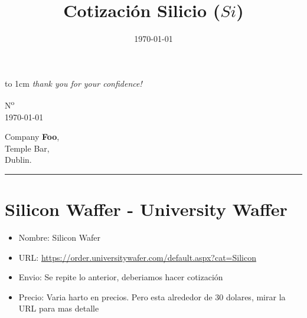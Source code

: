 \documentclass[a4paper]{article}
\title{Cotización Silicio ($Si$)}
\date{\today}
\makeatletter
\let\displayFont\relax
\let\thetitle\@title
\makeatother
\begin{document}
\parbox[b][2cm][t]{\rightalignment}{{\color{gray!95}\displayFont\fontsize{1.5cm}{1.5cm}\selectfont %
\vbox to 1cm{\vss %
%
\companyname{}%
%
}}
\vskip 3mm%
{\fontsize{0.44cm}{0.5cm}%
\emph{thank you for your confidence!}%
}
}%
%
\parbox[b][2cm][t]{0.35\textwidth}{}

\kern -5mm

\leavevmode\kern \rightalignment \parbox{0.35\textwidth}{\ttfamily N\textsuperscript{o} \invoicenum\\
\today }

\vskip 0.7cm

\leavevmode\kern \rightalignment\kern -3mm \colorbox{gray!85}{
  \kern 1mm\begin{minipage}[t]{0.5\textwidth}
    \color{white}
    \vskip 2mm
    Company \textbf{Foo},\\
    Temple Bar,\\
    Dublin.\\
    \vspace*{-3mm}%
  \end{minipage}
}

\vskip 2.3cm

\begin{center}
{\ttfamily\LARGE \thetitle}

\rule{2cm}{0.25pt}
\end{center}

\section{Silicon Waffer - University Waffer}
\begin{itemize}
  \item Nombre: Silicon Wafer 
  \item URL: \url{https://order.universitywafer.com/default.aspx?cat=Silicon}
  \item Envio: Se repite lo anterior, deberiamos hacer cotización
  \item Precio: Varia harto en precios. Pero esta alrededor de $30$ dolares, mirar la URL para mas detalle
\end{itemize}
\end{document}
